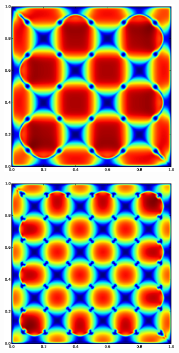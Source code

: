 \begin{figure}
\begin{subfigure}[b]{0.32\textwidth}
  \includegraphics[width=\textwidth]{figs/dynamic_pressure-25-10}
\end{subfigure}
\begin{subfigure}[b]{0.32\textwidth}
  \includegraphics[width=\textwidth]{figs/dynamic_pressure-35-10}

\end{subfigure}
\end{figure}
